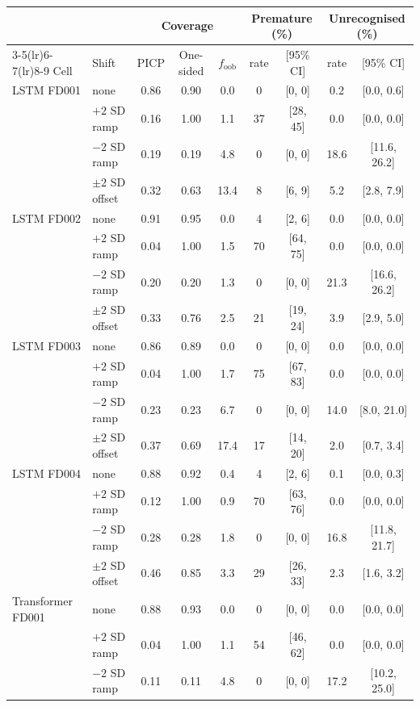 \begin{tabular}{llccccccc}\toprule
 & & \multicolumn{3}{c}{Coverage} & \multicolumn{2}{c}{Premature (\%)} & \multicolumn{2}{c}{Unrecognised (\%)} \\
\cmidrule(lr){3-5}\cmidrule(lr){6-7}\cmidrule(lr){8-9}
Cell & Shift & PICP & One-sided & $f_{\mathrm{oob}}$ & rate & [95\% CI] & rate & [95\% CI] \\ \midrule
LSTM FD001 & none & 0.86 & 0.90 & 0.0 & 0 & [0, 0] & 0.2 & [0.0, 0.6] \\
 & $+2$ SD ramp & 0.16 & 1.00 & 1.1 & 37 & [28, 45] & 0.0 & [0.0, 0.0] \\
 & $-2$ SD ramp & 0.19 & 0.19 & 4.8 & 0 & [0, 0] & 18.6 & [11.6, 26.2] \\
 & $\pm2$ SD offset & 0.32 & 0.63 & 13.4 & 8 & [6, 9] & 5.2 & [2.8, 7.9] \\
\addlinespace[2pt]
LSTM FD002 & none & 0.91 & 0.95 & 0.0 & 4 & [2, 6] & 0.0 & [0.0, 0.0] \\
 & $+2$ SD ramp & 0.04 & 1.00 & 1.5 & 70 & [64, 75] & 0.0 & [0.0, 0.0] \\
 & $-2$ SD ramp & 0.20 & 0.20 & 1.3 & 0 & [0, 0] & 21.3 & [16.6, 26.2] \\
 & $\pm2$ SD offset & 0.33 & 0.76 & 2.5 & 21 & [19, 24] & 3.9 & [2.9, 5.0] \\
\addlinespace[2pt]
LSTM FD003 & none & 0.86 & 0.89 & 0.0 & 0 & [0, 0] & 0.0 & [0.0, 0.0] \\
 & $+2$ SD ramp & 0.04 & 1.00 & 1.7 & 75 & [67, 83] & 0.0 & [0.0, 0.0] \\
 & $-2$ SD ramp & 0.23 & 0.23 & 6.7 & 0 & [0, 0] & 14.0 & [8.0, 21.0] \\
 & $\pm2$ SD offset & 0.37 & 0.69 & 17.4 & 17 & [14, 20] & 2.0 & [0.7, 3.4] \\
\addlinespace[2pt]
LSTM FD004 & none & 0.88 & 0.92 & 0.4 & 4 & [2, 6] & 0.1 & [0.0, 0.3] \\
 & $+2$ SD ramp & 0.12 & 1.00 & 0.9 & 70 & [63, 76] & 0.0 & [0.0, 0.0] \\
 & $-2$ SD ramp & 0.28 & 0.28 & 1.8 & 0 & [0, 0] & 16.8 & [11.8, 21.7] \\
 & $\pm2$ SD offset & 0.46 & 0.85 & 3.3 & 29 & [26, 33] & 2.3 & [1.6, 3.2] \\
\addlinespace[2pt]
Transformer FD001 & none & 0.88 & 0.93 & 0.0 & 0 & [0, 0] & 0.0 & [0.0, 0.0] \\
 & $+2$ SD ramp & 0.04 & 1.00 & 1.1 & 54 & [46, 62] & 0.0 & [0.0, 0.0] \\
 & $-2$ SD ramp & 0.11 & 0.11 & 4.8 & 0 & [0, 0] & 17.2 & [10.2, 25.0] \\

\end{tabular}
